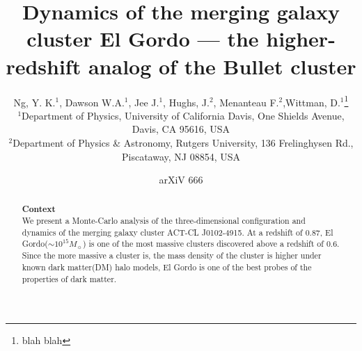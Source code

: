 \documentclass[useAMS,usenatbib]{mn2e}
\title[El Gordo]{Dynamics of the merging galaxy cluster El Gordo --- the higher-redshift analog of the Bullet cluster}
\author[author]{Ng, Y. K.$^{1}$, Dawson W.A.$^{1}$, Jee J.$^{1}$, Hughs, J.$^{2}$,
Menanteau F.$^{2}$,Wittman, D.$^{1}$\footnotemark[1]\thanks{blah blah}\\
$^{1}$Department of Physics, University of California Davis, One Shields Avenue, Davis, CA 95616, USA\\
$^{2}$Department of Physics \& Astronomy, Rutgers University, 136 Frelinghysen Rd., Piscataway, NJ 08854, USA}
\begin{document}
\date{arXiV 666}

\pagerange{\pageref{firstpage}--\pageref{lastpage}} 

\maketitle

\label{firstpage}

\begin{abstract}
\textbf{Context}\\
We present a Monte-Carlo analysis of the three-dimensional configuration and dynamics of the merging galaxy cluster ACT-CL J0102-4915. At a redshift of 0.87, El Gordo(\(\sim 10^{15} M_{\sun}\)) is one of the most massive clusters discovered above a redshift of 0.6. Since the more massive a cluster is, the mass density of the cluster is higher under known dark matter(DM) halo models, El Gordo is one of the best probes of the properties of dark matter.  


\end{abstract}
\end{document}
